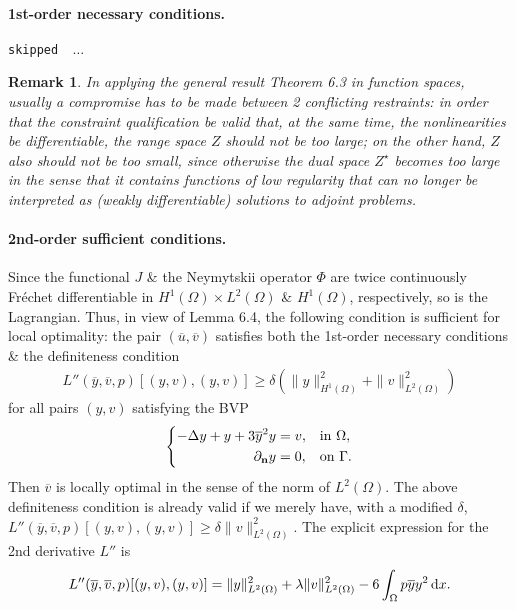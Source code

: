 \documentclass[oneside]{book}
\numberwithin{equation}{section}
\newtheorem{remark}{Remark}[chapter]
\begin{document}
\paragraph{1st-order necessary conditions.} \texttt{skipped \cite[pp. 336--337]{Troltzsch2010} $\ldots$}

\begin{remark}
	In applying the general result Theorem 6.3 in function spaces, usually a compromise has to be made between 2 conflicting restraints: in order that the constraint qualification be valid that, at the same time, the nonlinearities be differentiable, the range space $Z$ should not be too large; on the other hand, $Z$ also should not be too small, since otherwise the dual space $Z^\star$ becomes too large in the sense that it contains functions of low regularity that can no longer be interpreted as (weakly differentiable) solutions to adjoint problems.
\end{remark}

\paragraph{2nd-order sufficient conditions.} Since  the functional $J$ \& the Neymytskii operator $\Phi$ are twice continuously Fr\'echet differentiable in $H^1(\Omega)\times L^2(\Omega)$ \& $H^1(\Omega)$, respectively, so is the Lagrangian. Thus, in view of Lemma 6.4, the following condition is sufficient for local optimality: the pair $(\overline{u},\overline{v})$ satisfies both the 1st-order necessary conditions \& the definiteness condition
\begin{align*}
	L''(\overline{y},\overline{v},p)[(y,v),(y,v)]\ge\delta\left(\|y\|_{H^1(\Omega)}^2 + \|v\|_{L^2(\Omega)}^2\right)
\end{align*}
for all pairs $(y,v)$ satisfying the BVP
\begin{equation*}
	\left\{\begin{split}
		-\Delta y + y + 3\overline{y}^2y &= v,&&\mbox{in }\Omega,\\
		\partial_{\bf n}y &= 0,&&\mbox{on }\Gamma.
	\end{split}\right.
\end{equation*}
Then $\overline{v}$ is locally optimal in the sense of the norm of $L^2(\Omega)$. The above definiteness condition is already valid if we merely have, with a modified $\delta$, $L''(\overline{y},\overline{v},p)[(y,v),(y,v)]\ge\delta\|v\|_{L^2(\Omega)}^2$. The explicit expression for the 2nd derivative $L''$ is
\begin{align*}
	L''(\overline{y},\overline{v},p)[(y,v),(y,v)] = \|y\|_{L^2(\Omega)}^2 + \lambda\|v\|_{L^2(\Omega)}^2 - 6\int_\Omega p\overline{y}y^2\,{\rm d}x.
\end{align*}
\end{document}
